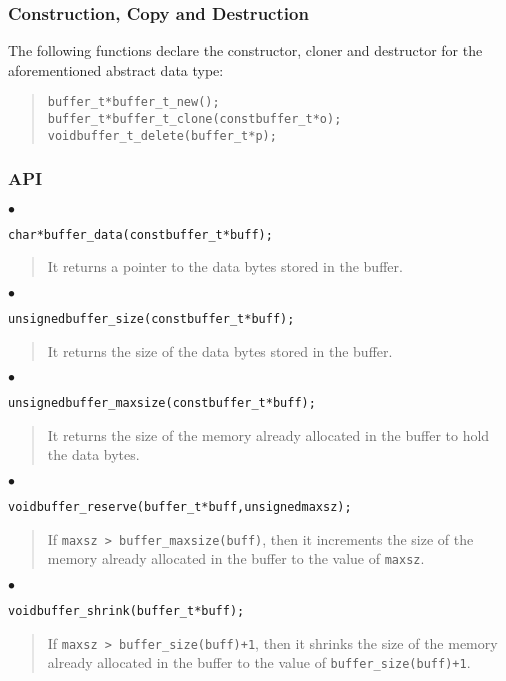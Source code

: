 \documentclass[a4paper]{article}
\newenvironment{code}%
{\begin{quote}\footnotesize\begin{alltt}}%
{\end{alltt}\end{quote}}%
\newenvironment{api}%
{\noindent$\bullet$\hfill\begin{minipage}[t]{0.97\linewidth}\footnotesize\begin{alltt}}%
{\end{alltt}\end{minipage}}%
\begin{document}
\subsubsection*{Construction, Copy and Destruction}
The following functions declare the constructor, cloner and destructor
for the aforementioned abstract data type:
\begin{code}
buffer_t* buffer_t_new();
buffer_t* buffer_t_clone(const buffer_t* o);
void buffer_t_delete(buffer_t* p);
\end{code}
\subsubsection*{API}
\begin{api}
char* buffer_data(const buffer_t* buff);
\end{api}
\begin{quote}\footnotesize
It returns a pointer to the data bytes stored in the buffer.
\end{quote}
\begin{api}
unsigned buffer_size(const buffer_t* buff);
\end{api}
\begin{quote}\footnotesize
It returns the size of the data bytes stored in the buffer.
\end{quote}
\begin{api}
unsigned buffer_maxsize(const buffer_t* buff);
\end{api}
\begin{quote}\footnotesize
It returns the size of the memory already allocated in the buffer to
hold the data bytes.
\end{quote}
\begin{api}
void buffer_reserve(buffer_t* buff, unsigned maxsz);
\end{api}
\begin{quote}\footnotesize
If \verb|maxsz > buffer_maxsize(buff)|, then it increments the size of the
memory already allocated in the buffer to the value of \verb|maxsz|.
\end{quote}
\begin{api}
void buffer_shrink(buffer_t* buff);
\end{api}
\begin{quote}\footnotesize
If \verb|maxsz > buffer_size(buff)+1|, then it shrinks the size of the
memory already allocated in the buffer to the value of \verb|buffer_size(buff)+1|.
\end{quote}
\end{document}
